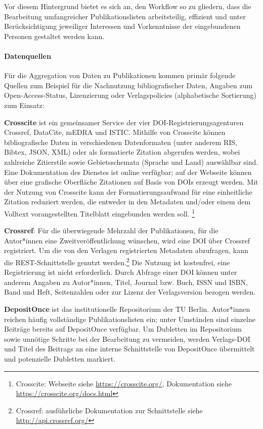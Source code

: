 \documentclass[a4paper,
fontsize=11pt,
oneside,
numbers=noperiodatend,
parskip=half-,
bibliography=totoc,
final
]{scrartcl}
\begin{document}
Vor diesem Hintergrund bietet es sich an, den Workflow so zu gliedern,
dass die Bearbeitung umfangreicher Publikationslisten arbeitsteilig,
effizient und unter Berücksichtigung jeweiliger Interessen und
Vorkenntnisse der eingebundenen Personen gestaltet werden kann.

\hypertarget{datenquellen}{%
\paragraph{Datenquellen}\label{datenquellen}}

Für die Aggregation von Daten zu Publikationen kommen primär folgende
Quellen zum Beispiel für die Nachnutzung bibliografischer Daten, Angaben
zum Open-Access-Status, Lizenzierung oder Verlagspolicies (alphabetische
Sortierung) zum Einsatz:

\textbf{Crosscite} ist ein gemeinsamer Service der vier
DOI-Registrierungsagenturen Crossref, DataCite, mEDRA und ISTIC.
Mithilfe von Crosscite können bibliografische Daten in verschiedenen
Datenformaten (unter anderem RIS, Bibtex, JSON, XML) oder als
formatierte Zitation abgerufen werden, wobei zahlreiche Zitierstile
sowie Gebietsschemata (Sprache und Land) auswählbar sind. Eine
Dokumentation des Dienstes ist online verfügbar; auf der Webseite können
über eine grafische Oberfläche Zitationen auf Basis von DOIs erzeugt
werden. Mit der Nutzung von Crosscite kann der Formatierungsaufwand für
eine einheitliche Zitation reduziert werden, die entweder in den
Metadaten und/oder einem dem Volltext vorangestellten Titelblatt
eingebunden werden soll. \footnote{Crosscite: Webseite siehe
  \url{https://crosscite.org/}, Dokumentation siehe
  \url{https://crosscite.org/docs.html}}

\textbf{Crossref}: Für die überwiegende Mehrzahl der Publikationen, für
die Autor*innen eine Zweitveröffentlichung wünschen, wird eine DOI über
Crossref registriert. Um die von den Verlagen registrierten Metadaten
abzufragen, kann die REST-Schnittstelle genutzt werden.\footnote{Crossref:
  ausführliche Dokumentation zur Schnittstelle siehe
  \url{http://api.crossref.org/}} Die Nutzung ist kostenfrei, eine
Registrierung ist nicht erforderlich. Durch Abfrage einer DOI können
unter anderem Angaben zu Autor*innen, Titel, Journal bzw. Buch, ISSN und
ISBN, Band und Heft, Seitenzahlen oder zur Lizenz der Verlagsversion
bezogen werden.

\textbf{DepositOnce} ist das institutionelle Repositorium der TU Berlin.
Autor*innen reichen häufig vollständige Publikationslisten ein; unter
Umständen sind einzelne Beiträge bereits auf DepositOnce verfügbar. Um
Dubletten im Repositorium sowie unnötige Schritte bei der Bearbeitung zu
vermeiden, werden Verlags-DOI und Titel des Beitrags an eine interne
Schnittstelle von DepositOnce übermittelt und potenzielle Dubletten
markiert.
\end{document}
